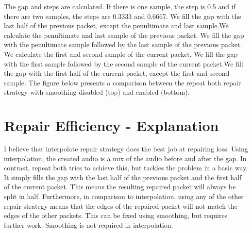 \documentclass{article} %
\begin{document}
The gap and steps are calculated. If there is one sample, the step is 0.5 and if there are two samples, the steps are 0.3333 and 0.6667. We fill the gap with the last half of the previous packet, except the penultimate and last sample.We calculate the penultimate and last sample of the previous packet. We fill the gap with the penultimate sample followed by the last sample of the previous packet. We calculate the first and second sample of the current packet. We fill the gap with the first sample followed by the second sample of the current packet.We fill the gap with the first half of the current packet, except the first and second sample. The figure below presents a comparison between the repeat both repair strategy with smoothing disabled (top) and enabled (bottom).

\begin{figure}[!htbp]
\centering
{}
\end{figure}

\section{Repair Efficiency - Explanation}

I believe that interpolate repair strategy does the best job at repairing loss. Using interpolation, the created audio is a mix of the audio before and after the gap. In contrast, repeat both tries to achieve this, but tackles the problem in a basic way. It simply fills the gap with the last half of the previous packet and the first half of the current packet. This means the resulting repaired packet will always be split in half. Furthermore, in comparison to interpolation, using any of the other repair strategy means that the edges of the repaired packet will not match the edges of the other packets. This can be fixed using smoothing, but requires further work. Smoothing is not required in interpolation.
\end{document}

